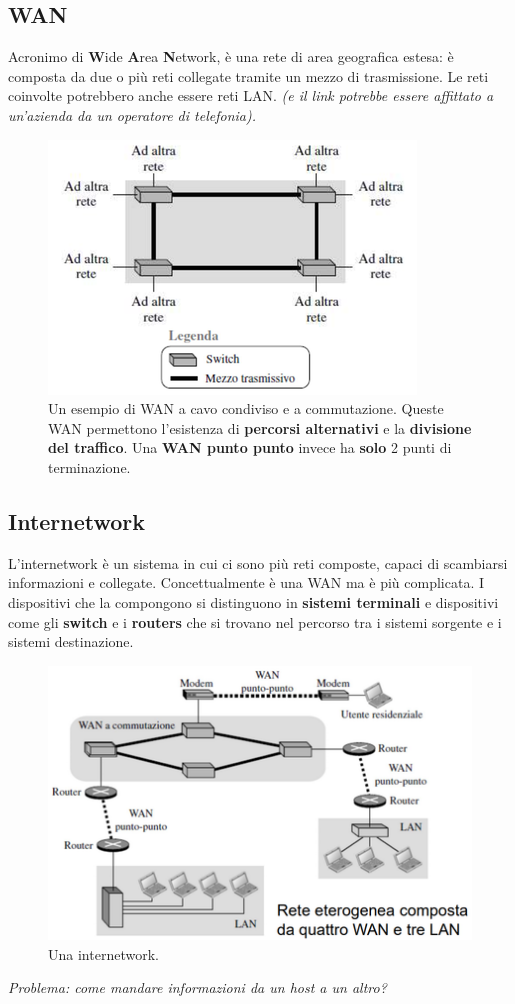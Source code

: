 \documentclass[11pt,a4paper]{article}
\theoremstyle{definition}
\begin{document}
\subsection{WAN}
Acronimo di \textbf{W}ide \textbf{A}rea \textbf{N}etwork, è una rete di area geografica estesa: è composta da due o più reti collegate tramite un mezzo di trasmissione. Le reti coinvolte potrebbero anche essere reti LAN. \textit{(e il link potrebbe essere affittato a un'azienda da un operatore di telefonia).}
\begin{figure}[!h]
	\includegraphics[scale=0.6]{Immagini/WAN_Switch.png}
	\centering
	\caption{Un esempio di WAN a cavo condiviso e a commutazione.\newline
		Queste WAN permettono l'esistenza di \textbf{percorsi alternativi} e la \textbf{divisione del traffico}. Una \textbf{WAN punto punto} invece ha \textbf{solo} 2 punti di terminazione.}
\end{figure}


\subsection{Internetwork}
L'internetwork è un sistema in cui ci sono più reti composte, capaci di scambiarsi informazioni e collegate. Concettualmente è una WAN ma è più complicata.\newline
I dispositivi che la compongono si distinguono in \textbf{sistemi terminali}
e dispositivi come gli \textbf{switch} e i \textbf{routers} che si trovano nel percorso tra i sistemi sorgente e i sistemi destinazione.
\begin{figure}[!h]
	\includegraphics[scale=0.4]{Immagini/Internetwork.png}
	\centering
	\caption{Una internetwork.}
\end{figure}\newline
\textit{Problema: come mandare informazioni da un host a un altro?}
\end{document}
